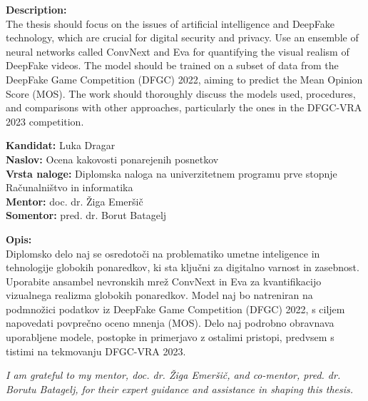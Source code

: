 \documentclass[a4paper,12pt,openright]{book}
\newcommand{\clearemptydoublepage}{\newpage{\pagestyle{empty}\cleardoublepage}}
\begin{document}
\bigskip
\noindent\textbf{Description:}\\
The thesis should focus on the issues of artificial intelligence and DeepFake technology, which are crucial for digital security and privacy. Use an ensemble of neural networks called ConvNext and Eva for quantifying the visual realism of DeepFake videos. The model should be trained on a subset of data from the DeepFake Game Competition (DFGC) 2022, aiming to predict the Mean Opinion Score (MOS). The work should thoroughly discuss the models used, procedures, and comparisons with other approaches, particularly the ones in the DFGC-VRA 2023 competition.

\vfill

\newpage

\bigskip


\noindent\textbf{Kandidat:} Luka Dragar\\
\noindent\textbf{Naslov:} Ocena kakovosti ponarejenih posnetkov\\
\noindent\textbf{Vrsta naloge:} Diplomska naloga na univerzitetnem programu prve stopnje Računalništvo in informatika \\
\noindent\textbf{Mentor:} doc. dr. Žiga Emeršič\\
\noindent\textbf{Somentor:} pred. dr. Borut Batagelj

\bigskip
\noindent\textbf{Opis:}\\
Diplomsko delo naj se osredotoči na problematiko umetne inteligence in tehnologije globokih ponaredkov, ki sta ključni za digitalno varnost in zasebnost. Uporabite ansambel nevronskih mrež ConvNext in Eva za kvantifikacijo vizualnega realizma globokih ponaredkov. Model naj bo natreniran na podmnožici podatkov iz DeepFake Game Competition (DFGC) 2022, s ciljem napovedati povprečno oceno mnenja (MOS). Delo naj podrobno obravnava uporabljene modele, postopke in primerjavo z ostalimi pristopi, predvsem s tistimi na tekmovanju DFGC-VRA 2023.






\vspace{2cm}

\clearemptydoublepage

\thispagestyle{empty}\mbox{}\vfill\null\it%
\noindent
I am grateful to my mentor, doc. dr. Žiga Emeršič, and co-mentor, pred. dr. Borutu Batagelj, for their expert guidance and assistance in shaping this thesis.
\rm\normalfont
\end{document}
